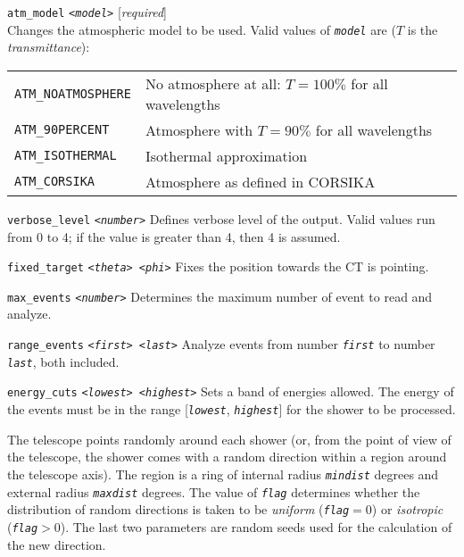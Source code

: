 \begin{Uentry}
\item[\texttt{atm\_model} \quad
  \texttt{<\emph{model}>}]
%
  [\emph{required}] \\
  Changes the atmospheric model to be used. Valid values of
  \texttt{\emph{model}} are ($T$ is the \emph{transmittance}):\\
%
  \begin{tabular}{ll}
    \texttt{ATM\_NOATMOSPHERE} & No atmosphere at all: $T = 100\%$ 
                                for all wavelengths\\
    \texttt{ATM\_90PERCENT}    & Atmosphere with $T = 90\%$ 
                                for all wavelengths\\
    \texttt{ATM\_ISOTHERMAL}   & Isothermal approximation \\
    \texttt{ATM\_CORSIKA}      & Atmosphere as defined in CORSIKA \\
  \end{tabular}

\item[\texttt{verbose\_level} \quad
  \texttt{<\emph{number}>}]
%
   Defines verbose level of the output. Valid values run from 0 to 4;
   if the value is greater than 4, then 4 is assumed.

\item[\texttt{fixed\_target} \quad
  \texttt{<\emph{theta}>  <\emph{phi}>}]
%
  Fixes the position towards the CT is pointing.

\item[\texttt{max\_events} \quad
  \texttt{<\emph{number}>}]
%
  Determines the maximum number of event to read and analyze.

\item[\texttt{range\_events} \quad
  \texttt{<\emph{first}>  <\emph{last}>}]
%
  Analyze events from number \texttt{\emph{first}} to number
  \texttt{\emph{last}}, both included.

\item[\texttt{energy\_cuts} \quad
  \texttt{<\emph{lowest}>  <\emph{highest}>}]
%
  Sets a band of energies allowed. The energy of the events must be in
  the range [\texttt{\emph{lowest}}, \texttt{\emph{highest}}] for the
  shower to be processed.

\item[\texttt{random\_pointing} \quad
  \texttt{
    <\emph{mindist}>  <\emph{maxdist}>  <\emph{flag}>  %
    <\emph{seed1}>  <\emph{seed2}>  }]
%
  The telescope points randomly around each shower (or, from the point
  of view of the telescope, the shower comes with a random direction
  within a region around the telescope axis). The region is a ring of
  internal radius \texttt{\emph{mindist}} degrees and external radius
  \texttt{\emph{maxdist}} degrees. The value of \texttt{\emph{flag}}
  determines whether the distribution of random directions is taken to
  be \emph{uniform} (\texttt{\emph{flag}}$=0$) or \emph{isotropic}
  (\texttt{\emph{flag}}$>0$). The last two parameters are random seeds
  used for the calculation of the new direction.
  

\end{Uentry}
